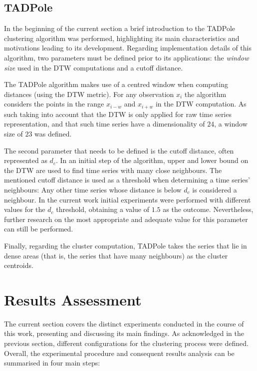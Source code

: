 \documentclass[9pt,journal,compsoc]{IEEEtran}
\begin{document}
\subsection{TADPole}

In the beginning of the current section a brief introduction to the TADPole clustering algorithm was performed, highlighting its main characteristics and motivations leading to its development. Regarding implementation details of this algorithm, two parameters must be defined prior to its applications: the \emph{window size} used in the DTW computations and a cutoff distance.

The TADPole algorithm makes use of a centred window when computing distances (using the DTW metric). For any observation $x_{i}$ the algorithm considers the points in the range $x_{i-w}$ and $x_{i+w}$ in the DTW computation. As such taking into account that the DTW is only applied for raw time series representation, and that such time series have a dimensionality of $24$, a window size of $23$ was defined.

The second parameter that needs to be defined is the cutoff distance, often represented as $d_{c}$. In an initial step of the algorithm, upper and lower bound on the DTW are used to find time series with many close neighbours. The mentioned cutoff distance is used as a threshold when determining a time series' neighbours: Any other time series whose distance is below $d_{c}$ is considered a neighbour. In the current work initial experiments were performed with different values for the $d_{c}$ threshold, obtaining a value of $1.5$ as the outcome. Nevertheless, further research on the most appropriate and adequate value for this parameter can still be performed.

Finally, regarding the cluster computation, TADPole takes the series that lie in dense areas (that is, the series that have many neighbours) as the cluster centroids.

\section{Results Assessment}
\label{results_assessment}

The current section covers the distinct experiments conducted in the course of this work, presenting and discussing its main findings. As acknowledged in the previous section, different configurations for the clustering process were defined. Overall, the experimental procedure and consequent results analysis can be summarised in four main steps:
\end{document}
